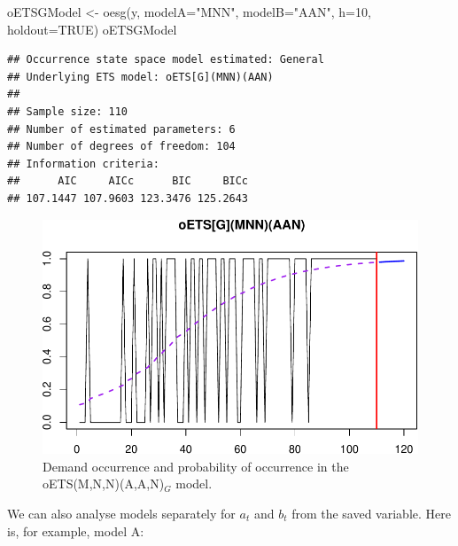\documentclass[
]{book}
\newenvironment{Shaded}{\begin{snugshade}}{\end{snugshade}}
\newcommand{\AttributeTok}[1]{\textcolor[rgb]{0.77,0.63,0.00}{#1}}
\newcommand{\ConstantTok}[1]{\textcolor[rgb]{0.00,0.00,0.00}{#1}}
\newcommand{\DecValTok}[1]{\textcolor[rgb]{0.00,0.00,0.81}{#1}}
\newcommand{\FunctionTok}[1]{\textcolor[rgb]{0.00,0.00,0.00}{#1}}
\newcommand{\NormalTok}[1]{#1}
\newcommand{\OtherTok}[1]{\textcolor[rgb]{0.56,0.35,0.01}{#1}}
\newcommand{\SpecialCharTok}[1]{\textcolor[rgb]{0.00,0.00,0.00}{#1}}
\newcommand{\StringTok}[1]{\textcolor[rgb]{0.31,0.60,0.02}{#1}}
\theoremstyle{definition}
\theoremstyle{definition}
\theoremstyle{definition}
\theoremstyle{definition}
\theoremstyle{remark}
\begin{document}
\begin{Shaded}
\begin{Highlighting}[]
\NormalTok{oETSGModel }\OtherTok{\textless{}{-}} \FunctionTok{oesg}\NormalTok{(y, }\AttributeTok{modelA=}\StringTok{"MNN"}\NormalTok{, }\AttributeTok{modelB=}\StringTok{"AAN"}\NormalTok{,}
                   \AttributeTok{h=}\DecValTok{10}\NormalTok{, }\AttributeTok{holdout=}\ConstantTok{TRUE}\NormalTok{)}
\NormalTok{oETSGModel}
\end{Highlighting}
\end{Shaded}

\begin{verbatim}
## Occurrence state space model estimated: General
## Underlying ETS model: oETS[G](MNN)(AAN)
## 
## Sample size: 110
## Number of estimated parameters: 6
## Number of degrees of freedom: 104
## Information criteria: 
##      AIC     AICc      BIC     BICc 
## 107.1447 107.9603 123.3476 125.2643
\end{verbatim}

\begin{figure}
\centering
\includegraphics{Svetunkov--2022----ADAM_files/figure-latex/oETSGModel-1.pdf}
\caption{\label{fig:oETSGModel}Demand occurrence and probability of occurrence in the oETS(M,N,N)(A,A,N)\(_G\) model.}
\end{figure}

We can also analyse models separately for \(a_t\) and \(b_t\) from the saved variable. Here is, for example, model A:

\begin{Shaded}
\end{Shaded}
\end{document}
